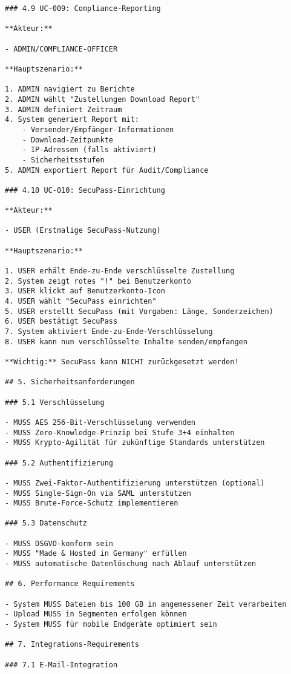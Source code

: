 \begin{verbatim}
### 4.9 UC-009: Compliance-Reporting

**Akteur:**

- ADMIN/COMPLIANCE-OFFICER

**Hauptszenario:**

1. ADMIN navigiert zu Berichte
2. ADMIN wählt "Zustellungen Download Report"
3. ADMIN definiert Zeitraum
4. System generiert Report mit:
    - Versender/Empfänger-Informationen
    - Download-Zeitpunkte
    - IP-Adressen (falls aktiviert)
    - Sicherheitsstufen
5. ADMIN exportiert Report für Audit/Compliance

### 4.10 UC-010: SecuPass-Einrichtung

**Akteur:**

- USER (Erstmalige SecuPass-Nutzung)

**Hauptszenario:**

1. USER erhält Ende-zu-Ende verschlüsselte Zustellung
2. System zeigt rotes "!" bei Benutzerkonto
3. USER klickt auf Benutzerkonto-Icon
4. USER wählt "SecuPass einrichten"
5. USER erstellt SecuPass (mit Vorgaben: Länge, Sonderzeichen)
6. USER bestätigt SecuPass
7. System aktiviert Ende-zu-Ende-Verschlüsselung
8. USER kann nun verschlüsselte Inhalte senden/empfangen

**Wichtig:** SecuPass kann NICHT zurückgesetzt werden!

## 5. Sicherheitsanforderungen

### 5.1 Verschlüsselung

- MUSS AES 256-Bit-Verschlüsselung verwenden
- MUSS Zero-Knowledge-Prinzip bei Stufe 3+4 einhalten
- MUSS Krypto-Agilität für zukünftige Standards unterstützen

### 5.2 Authentifizierung

- MUSS Zwei-Faktor-Authentifizierung unterstützen (optional)
- MUSS Single-Sign-On via SAML unterstützen
- MUSS Brute-Force-Schutz implementieren

### 5.3 Datenschutz

- MUSS DSGVO-konform sein
- MUSS "Made & Hosted in Germany" erfüllen
- MUSS automatische Datenlöschung nach Ablauf unterstützen

## 6. Performance Requirements

- System MUSS Dateien bis 100 GB in angemessener Zeit verarbeiten
- Upload MUSS in Segmenten erfolgen können
- System MUSS für mobile Endgeräte optimiert sein

## 7. Integrations-Requirements

### 7.1 E-Mail-Integration


\end{verbatim}
